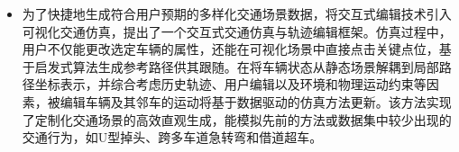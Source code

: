 \begin{itemize}%





    \item 为了快捷地生成符合用户预期的多样化交通场景数据，将交互式编辑技术引入可视化交通仿真，提出了一个交互式交通仿真与轨迹编辑框架。仿真过程中，用户不仅能更改选定车辆的属性，还能在可视化场景中直接点击关键点位，基于启发式算法生成参考路径供其跟随。在将车辆状态从静态场景解耦到局部路径坐标表示，并综合考虑历史轨迹、用户编辑以及环境和物理运动约束等因素，被编辑车辆及其邻车的运动将基于数据驱动的仿真方法更新。该方法实现了定制化交通场景的高效直观生成，能模拟先前的方法或数据集中较少出现的交通行为，如U型掉头、跨多车道急转弯和借道超车。


\end{itemize}
